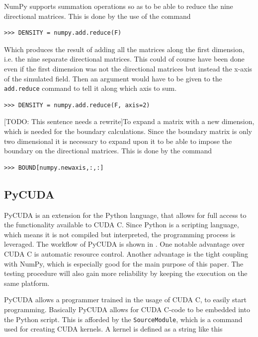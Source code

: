NumPy supports summation operations so as to be able to reduce the nine directional matrices. This is done by the use of the command

\begin{verbatim}
>>> DENSITY = numpy.add.reduce(F)
\end{verbatim}

Which produces the result of adding all the matrices along the first dimension, i.e. the nine separate directional matrices. This could of course have been done even if the first dimension was not the directional matrices but instead the x-axis of the simulated field. Then an argument would have to be given to the \texttt{add.reduce} command to tell it along which axis to sum.

\begin{verbatim}
>>> DENSITY = numpy.add.reduce(F, axis=2)
\end{verbatim}

[TODO: This sentence needs a rewrite]To expand a matrix with a new dimension, which is needed for the boundary calculations. Since the boundary matrix is only two dimensional it is necessary to expand upon it to be able to impose the boundary on the directional matrices. This is done by the command

\begin{verbatim}
>>> BOUND[numpy.newaxis,:,:]
\end{verbatim}



\subsection{PyCUDA}
PyCUDA is an extension for the Python language, that allows for full access to the functionality available to CUDA C. Since Python is a scripting language, which means it is not compiled but interpreted, the programming process is leveraged. The workflow of PyCUDA is shown in . One notable advantage over CUDA C is automatic resource control. Another advantage is the tight coupling with NumPy, which is especially good for the main purpose of this paper. The testing procedure will also gain more reliability by keeping the execution on the same platform.


PyCUDA allows a programmer trained in the usage of CUDA C, to easily start programming. Basically PyCUDA allows for CUDA C-code to be embedded into the Python script. This is afforded by the \texttt{SourceModule}, which is a command used for creating CUDA kernels. A kernel is defined as a string like this

